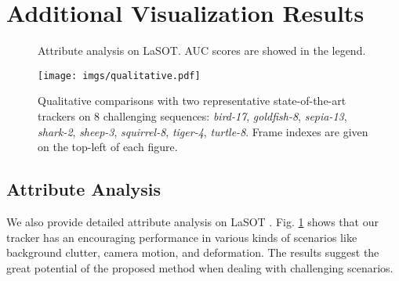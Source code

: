 \documentclass[runningheads]{llncs}
\begin{document}
\section{Additional Visualization Results}

\begin{figure}[t]
\centering
{}
\enspace
{}
\enspace
{}
\enspace
{}
\enspace
{}
\enspace
{}
\enspace
{}
\enspace
{}
\enspace
{}
\enspace
{}
\enspace
{}
\enspace
{}
\enspace
{}
\enspace
{}
\caption{Attribute analysis on LaSOT. AUC scores are showed in the legend.}
\label{figure-analysis}
\end{figure}

\begin{figure}[t]
\centering
\texttt{[image: imgs/qualitative.pdf]}
\caption{Qualitative comparisons with two representative state-of-the-art trackers on 8 challenging sequences: \textit{bird-17}, \textit{goldfish-8}, \textit{sepia-13}, \textit{shark-2}, \textit{sheep-3}, \textit{squirrel-8}, \textit{tiger-4}, \textit{turtle-8}. Frame indexes are given on the top-left of each figure.}
\label{figure-qualitative}
\end{figure}

\subsection{Attribute Analysis}
We also provide detailed attribute analysis on LaSOT \cite{fan2019lasot}. Fig. \ref{figure-analysis} shows that our tracker has an encouraging performance in various kinds of scenarios like background clutter, camera motion, and deformation. The results suggest the great potential of the proposed method when dealing with challenging scenarios.
\end{document}
